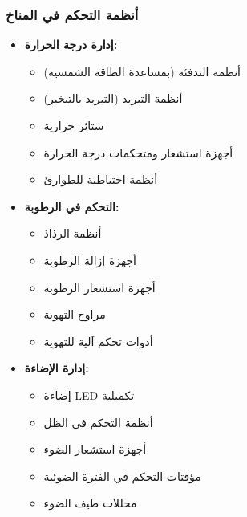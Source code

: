 \subsubsection{أنظمة التحكم في المناخ}
\begin{itemize}
    \item \textbf{إدارة درجة الحرارة:}
    \begin{itemize}
        \item أنظمة التدفئة (بمساعدة الطاقة الشمسية)
        \item أنظمة التبريد (التبريد بالتبخير)
        \item ستائر حرارية
        \item أجهزة استشعار ومتحكمات درجة الحرارة
        \item أنظمة احتياطية للطوارئ
    \end{itemize}
    
    \item \textbf{التحكم في الرطوبة:}
    \begin{itemize}
        \item أنظمة الرذاذ
        \item أجهزة إزالة الرطوبة
        \item أجهزة استشعار الرطوبة
        \item مراوح التهوية
        \item أدوات تحكم آلية للتهوية
    \end{itemize}
    
    \item \textbf{إدارة الإضاءة:}
    \begin{itemize}
        \item إضاءة LED تكميلية
        \item أنظمة التحكم في الظل
        \item أجهزة استشعار الضوء
        \item مؤقتات التحكم في الفترة الضوئية
        \item محللات طيف الضوء
    \end{itemize}
\end{itemize}

